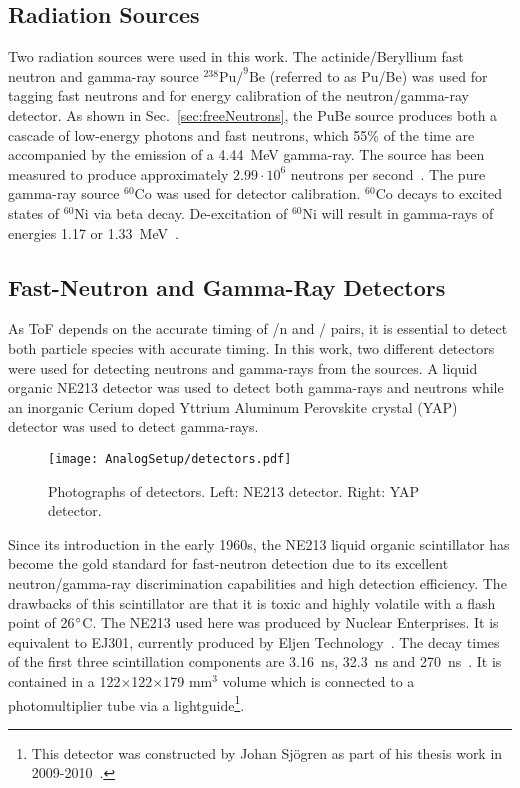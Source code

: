 \documentclass[main.tex]{subfiles}
\begin{document}
\subsection{Radiation Sources}
Two radiation sources were used in this work. The actinide/Beryllium fast neutron and gamma-ray source $^\text{238}\text{Pu}/^\text{9}\text{Be}$ (referred to as Pu/Be) was used for tagging fast neutrons and for energy calibration of the neutron/gamma-ray detector. As shown in Sec.~\ref{sec:freeNeutrons}, the PuBe source produces both a cascade of low-energy photons and fast neutrons, which 55\% of the time are accompanied by the emission of a \SI{4.44}{\MeV} gamma-ray. The source has been measured to produce approximately $\text{2.99}\cdot\text{10}^\text{6}$ neutrons per second~\cite{Scherzinger:2017}. The pure gamma-ray source $^\text{60}\text{Co}$ was used for detector calibration. $^\text{60}\text{Co}$ decays to excited states of $^\text{60}\text{Ni}$ via beta decay. De-excitation of $^\text{60}\text{Ni}$ will result in gamma-rays of energies 1.17 or \SI{1.33}{MeV}~\cite{Nudat}.



\subsection{Fast-Neutron and Gamma-Ray Detectors}
As ToF depends on the accurate timing of \textgamma /n and \textgamma /\textgamma\; pairs, it is essential to detect both particle species with accurate timing. In this work, two different detectors were used for detecting neutrons and gamma-rays from the sources. A liquid organic NE213 detector was used to detect both gamma-rays and neutrons while an inorganic Cerium doped Yttrium Aluminum Perovskite crystal (YAP) detector was used to detect gamma-rays. 

\begin{figure}[h]
    \centering
        \texttt{[image: AnalogSetup/detectors.pdf]}
        \caption[Photographs of detectors]{Photographs of detectors. Left: NE213 detector. Right: YAP detector.}
    \label{fig:detectors}
\end{figure}

Since its introduction in the early 1960s, the NE213 liquid organic scintillator has become the gold standard for fast-neutron detection due to its excellent neutron/gamma-ray discrimination capabilities and high detection efficiency. 
The drawbacks of this scintillator are that it is toxic and highly volatile with a flash point of 26$\text{\degree}$C. The NE213 used here was produced by Nuclear Enterprises. It is equivalent to EJ301, currently produced by Eljen Technology~\cite{Eljen}. The decay times of the first three scintillation components are \SI{3.16}{ns}, \SI{32.3}{ns} and \SI{270}{ns}~\cite{Eljen}. It is contained in a 122$\times$122$\times$179 \si{\mm}$^\text{3}$ volume which is connected to a photomultiplier tube via a lightguide\footnote{This detector was constructed by Johan Sjögren as part of his thesis work in 2009-2010~\cite{sjogren}.}.
\end{document}
